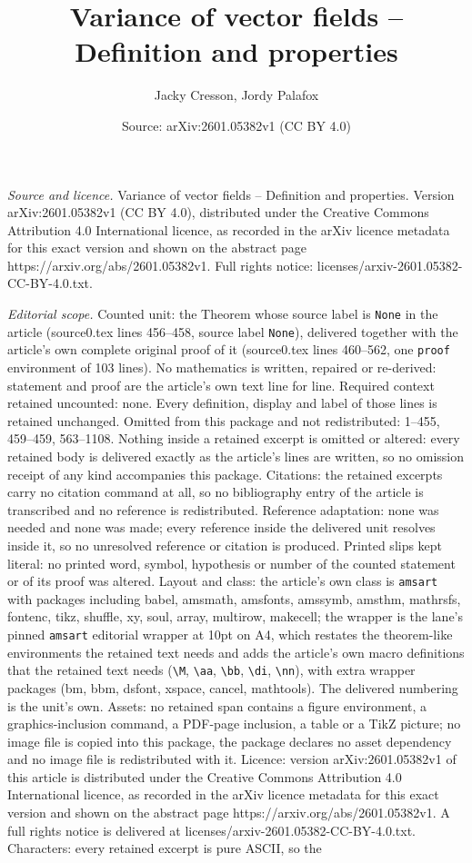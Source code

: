 \documentclass[10pt,a4paper]{amsart}
\title[Variance of vector fields -- Definition and properties]{Variance of vector fields -- Definition and properties}
\author{Jacky Cresson, Jordy Palafox}
\date{Source: arXiv:2601.05382v1 (CC BY 4.0)}
\begin{document}
\maketitle

\noindent\emph{Source and licence.} Variance of vector fields -- Definition and properties. Version arXiv:2601.05382v1 (CC BY 4.0), distributed under the Creative Commons Attribution 4.0 International licence, as recorded in the arXiv licence metadata for this exact version and shown on the abstract page https://arxiv.org/abs/2601.05382v1. Full rights notice: licenses/arxiv-2601.05382-CC-BY-4.0.txt.\par\smallskip

\noindent\textit{Editorial scope.} Counted unit: the Theorem whose source label is \texttt{None} in the article (source0.tex lines 456--458, source label \texttt{None}), delivered together with the article's own complete original proof of it (source0.tex lines 460--562, one \texttt{proof} environment of 103 lines). No mathematics is written, repaired or re-derived: statement and proof are the article's own text line for line. Required context retained uncounted: none. Every definition, display and label of those lines is retained unchanged. Omitted from this package and not redistributed: 1--455, 459--459, 563--1108. Nothing inside a retained excerpt is omitted or altered: every retained body is delivered exactly as the article's lines are written, so no omission receipt of any kind accompanies this package. Citations: the retained excerpts carry no citation command at all, so no bibliography entry of the article is transcribed and no reference is redistributed. Reference adaptation: none was needed and none was made; every reference inside the delivered unit resolves inside it, so no unresolved reference or citation is produced. Printed slips kept literal: no printed word, symbol, hypothesis or number of the counted statement or of its proof was altered. Layout and class: the article's own class is \texttt{amsart} with packages including babel, amsmath, amsfonts, amssymb, amsthm, mathrsfs, fontenc, tikz, shuffle, xy, soul, array, multirow, makecell; the wrapper is the lane's pinned \texttt{amsart} editorial wrapper at 10pt on A4, which restates the theorem-like environments the retained text needs and adds the article's own macro definitions that the retained text needs (\texttt{\textbackslash M}, \texttt{\textbackslash aa}, \texttt{\textbackslash bb}, \texttt{\textbackslash di}, \texttt{\textbackslash nn}), with extra wrapper packages (bm, bbm, dsfont, xspace, cancel, mathtools). The delivered numbering is the unit's own. Assets: no retained span contains a figure environment, a graphics-inclusion command, a PDF-page inclusion, a table or a TikZ picture; no image file is copied into this package, the package declares no asset dependency and no image file is redistributed with it. Licence: version arXiv:2601.05382v1 of this article is distributed under the Creative Commons Attribution 4.0 International licence, as recorded in the arXiv licence metadata for this exact version and shown on the abstract page https://arxiv.org/abs/2601.05382v1. A full rights notice is delivered at licenses/arxiv-2601.05382-CC-BY-4.0.txt. Characters: every retained excerpt is pure ASCII, so the 
\end{document}
